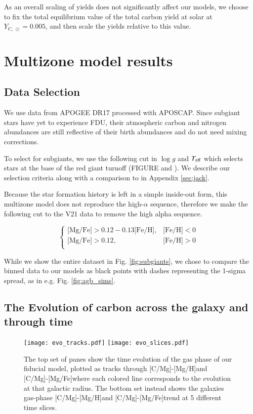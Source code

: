 \documentclass[12pt,oneside]{report}
\newcommand{\caah}{[C/Mg]-[Mg/H]}
\newcommand{\caafe}{[C/Mg]-[Mg/Fe]}
\newcommand{\sun}{\ensuremath{\odot}}
\begin{document}
    As an overall scaling of yields does not significantly affect our models, we choose to fix the total equilibrium value of the total carbon yield at solar at $Y_{\text{C},\ \sun} = 0.005$, and then scale the yields relative to this value. 

\chapter{Multizone model results}
\section{Data Selection}

We use data from APOGEE DR17 \citep{apogee17} processed with APOSCAP. Since subgiant stars have yet to experience FDU, their atmospheric carbon and nitrogen abundances are still reflective of their birth abundances and do not need mixing corrections. 

To select for subgiants, we use the following cut in $\log g$ and $T_{\rm eff}$
which selects stars at the base of the red giant turnoff (FIGURE and
\cite{jack_subgiant}). We describe our selection criteria along with a 
comparison to \citet{fiorenzo+21} in Appendix \ref{sec:jack}. 

Because the star formation history is left in a simple inside-out form, this multizone model does not reproduce the high-$\alpha$ sequence, therefore we make the following cut to the V21 data to remove the high alpha sequence.

\begin{equation}
\begin{cases}
\text{[Mg/Fe]} >0.12-0.13\text{[Fe/H]}, & \text{[Fe/H]}<0\\
\text{[Mg/Fe]} >0.12, & \text{[Fe/H]}>0\\
\end{cases}
\end{equation}

While we show the entire dataset in Fig. \ref{fig:subgiants}, we chose to compare the
binned data to our models as black points with dashes representing the 1-sigma
spread, as in e.g. Fig. \ref{fig:agb_sims}. 



\section{The Evolution of carbon across the galaxy and through time}

\begin{figure}
\label{fig:c_evo}
\texttt{[image: evo\_tracks.pdf]}
\texttt{[image: evo\_slices.pdf]}
\caption[Carbon chemical evolution tracks]{The top set of panes show the time evolution of the gas phase of our
    fiducial model, plotted as tracks through \caah and \caafe where each colored line corresponds to the evolution at that galactic radius. 
The bottom set instead shows the galaxies gas-phase \caah and \caafe trend at 5 different time slices. 
}
\end{figure}
\end{document}
